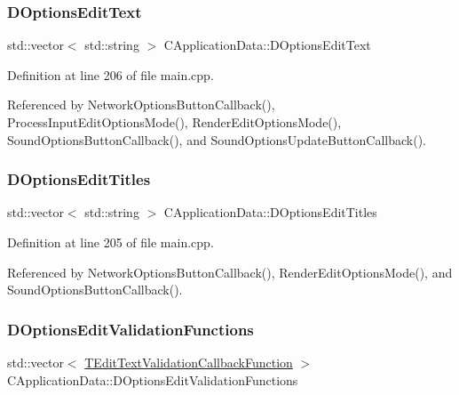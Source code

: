 \subsubsection{\texorpdfstring{D\+Options\+Edit\+Text}{DOptionsEditText}}
{\footnotesize\ttfamily std\+::vector$<$ std\+::string $>$ C\+Application\+Data\+::\+D\+Options\+Edit\+Text\hspace{0.3cm}{\ttfamily [protected]}}



Definition at line 206 of file main.\+cpp.



Referenced by Network\+Options\+Button\+Callback(), Process\+Input\+Edit\+Options\+Mode(), Render\+Edit\+Options\+Mode(), Sound\+Options\+Button\+Callback(), and Sound\+Options\+Update\+Button\+Callback().

\hypertarget{classCApplicationData_a7a322ef6b8c1db3e995c6b493230fd05}{}\label{classCApplicationData_a7a322ef6b8c1db3e995c6b493230fd05} 
\subsubsection{\texorpdfstring{D\+Options\+Edit\+Titles}{DOptionsEditTitles}}
{\footnotesize\ttfamily std\+::vector$<$ std\+::string $>$ C\+Application\+Data\+::\+D\+Options\+Edit\+Titles\hspace{0.3cm}{\ttfamily [protected]}}



Definition at line 205 of file main.\+cpp.



Referenced by Network\+Options\+Button\+Callback(), Render\+Edit\+Options\+Mode(), and Sound\+Options\+Button\+Callback().

\hypertarget{classCApplicationData_ab76fa444142de66fdb058f390e01112c}{}\label{classCApplicationData_ab76fa444142de66fdb058f390e01112c} 
\subsubsection{\texorpdfstring{D\+Options\+Edit\+Validation\+Functions}{DOptionsEditValidationFunctions}}
{\footnotesize\ttfamily std\+::vector$<$ \hyperlink{main_8cpp_a1f079840d4510b96faa423932bed3af0}{T\+Edit\+Text\+Validation\+Callback\+Function} $>$ C\+Application\+Data\+::\+D\+Options\+Edit\+Validation\+Functions\hspace{0.3cm}{\ttfamily [protected]}}



